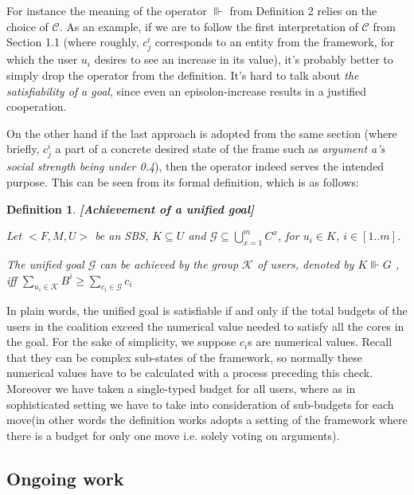 \documentclass{article}
\newtheorem{definition}{Definition}
\begin{document}
For instance the meaning of the operator $\Vvdash$ from Definition 2 relies on the choice of $\mathcal{C}$. As an example, if we are to follow the first interpretation of $\mathcal{C}$ from Section 1.1 (where roughly, $c_j^i$ corresponds to an entity from the framework, for which the user $u_i$ desires to see an increase in its value), it's probably better to simply drop the operator from the definition. It's hard to talk about \emph{the satisfiability of a goal}, since even an episolon-increase results in a justified cooperation. 

On the other hand if the last approach is adopted from the same section (where briefly, $c_j^i$ a part of a concrete desired state of the frame such as \emph{argument a's social strength being under 0.4}), then the operator indeed serves the intended purpose. This can be seen from its formal definition, which is as follows:

\begin{definition}\textbf{[Achievement of a unified goal]}

Let  $<F, M, U>$ be an SBS,  $K \subseteq U$ and $\mathcal{G} \subseteq \bigcup_{x=1}^{m} C^{x} $,  for $u_i \in K$, $i \in [1..m]$.

The unified goal $\mathcal{G}$ can be achieved by the group $\mathcal{K}$ of users, denoted by $ K \Vvdash G$ , iff $\sum_{u_{i} \in \mathcal{K}} B^i \geq \sum_{c_{i} \in \mathcal{G}} c_i $ 


\end{definition}



In plain words, the unified goal is satisfiable if and only if the total budgets of the users in the coalition exceed the numerical value needed to satisfy all the cores in the goal. For the sake of simplicity, we suppose $c_i$s are numerical values. Recall that they can be complex sub-states of the framework, so normally these numerical values have to be calculated with a process preceding this check. Moreover we have taken a single-typed budget for all users, where as in sophisticated setting we have to take into consideration of sub-budgets for each move(in other words the definition works adopts a setting of the framework where there is a budget for only one move i.e. solely voting on arguments). 


\subsection{Ongoing work}
\end{document}
